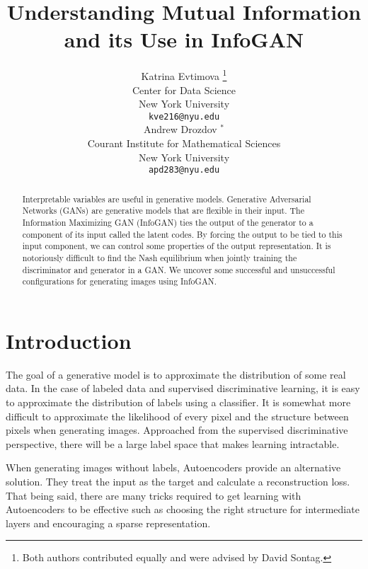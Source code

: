 \documentclass{article}
\title{Understanding Mutual Information \\ and its Use in InfoGAN}
\author{
  Katrina Evtimova \thanks{Both authors contributed equally and were advised by David Sontag. } \\
  Center for Data Science \\
  New York University\\
  \texttt{kve216@nyu.edu} \\
   \And
   Andrew Drozdov $^{*}$ \\
   Courant Institute for Mathematical Sciences \\
   New York University \\
   \texttt{apd283@nyu.edu} \\
}
\begin{document}

\maketitle

\begin{abstract}

\begin{itemize}
    Interpretable variables are useful in generative models. Generative Adversarial Networks (GANs) are generative models that are flexible in their input. The Information Maximizing GAN (InfoGAN) ties the output of the generator to a component of its input called the latent codes. By forcing the output to be tied to this input component, we can control some properties of the output representation. It is notoriously difficult to find the Nash equilibrium when jointly training the discriminator and generator in a GAN. We uncover some successful and unsuccessful configurations for generating images using InfoGAN.
\end{itemize}
    
\end{abstract}

\section{Introduction}

The goal of a generative model is to approximate the distribution of some real data. In the case of labeled data and supervised discriminative learning, it is easy to approximate the distribution of labels using a classifier. It is somewhat more difficult to approximate the likelihood of every pixel and the structure between pixels when generating images. Approached from the supervised discriminative perspective, there will be a large label space that makes learning intractable.

When generating images without labels, Autoencoders provide an alternative solution. They treat the input as the target and calculate a reconstruction loss. That being said, there are many tricks required to get learning with Autoencoders to be effective such as choosing the right structure for intermediate layers and encouraging a sparse representation.

\end{document}
